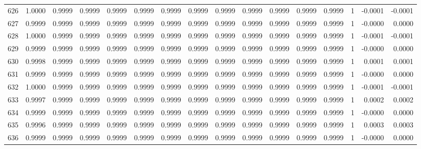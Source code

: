 \begin{tabular}{lrrrrrrrrrrrrrrr}
626 &      1.0000 &  0.9999 &  0.9999 &  0.9999 &  0.9999 &  0.9999 &  0.9999 &  0.9999 &  0.9999 &  0.9999 &   0.9999 &     0.9999 &      1 &                   -0.0001 &                    -0.0001 \\
627 &      0.9999 &  0.9999 &  0.9999 &  0.9999 &  0.9999 &  0.9999 &  0.9999 &  0.9999 &  0.9999 &  0.9999 &   0.9999 &     0.9999 &      1 &                   -0.0000 &                     0.0000 \\
628 &      1.0000 &  0.9999 &  0.9999 &  0.9999 &  0.9999 &  0.9999 &  0.9999 &  0.9999 &  0.9999 &  0.9999 &   0.9999 &     0.9999 &      1 &                   -0.0001 &                    -0.0001 \\
629 &      0.9999 &  0.9999 &  0.9999 &  0.9999 &  0.9999 &  0.9999 &  0.9999 &  0.9999 &  0.9999 &  0.9999 &   0.9999 &     0.9999 &      1 &                   -0.0000 &                     0.0000 \\
630 &      0.9998 &  0.9999 &  0.9999 &  0.9999 &  0.9999 &  0.9999 &  0.9999 &  0.9999 &  0.9999 &  0.9999 &   0.9999 &     0.9999 &      1 &                    0.0001 &                     0.0001 \\
631 &      0.9999 &  0.9999 &  0.9999 &  0.9999 &  0.9999 &  0.9999 &  0.9999 &  0.9999 &  0.9999 &  0.9999 &   0.9999 &     0.9999 &      1 &                   -0.0000 &                     0.0000 \\
632 &      1.0000 &  0.9999 &  0.9999 &  0.9999 &  0.9999 &  0.9999 &  0.9999 &  0.9999 &  0.9999 &  0.9999 &   0.9999 &     0.9999 &      1 &                   -0.0001 &                    -0.0001 \\
633 &      0.9997 &  0.9999 &  0.9999 &  0.9999 &  0.9999 &  0.9999 &  0.9999 &  0.9999 &  0.9999 &  0.9999 &   0.9999 &     0.9999 &      1 &                    0.0002 &                     0.0002 \\
634 &      0.9999 &  0.9999 &  0.9999 &  0.9999 &  0.9999 &  0.9999 &  0.9999 &  0.9999 &  0.9999 &  0.9999 &   0.9999 &     0.9999 &      1 &                   -0.0000 &                     0.0000 \\
635 &      0.9996 &  0.9999 &  0.9999 &  0.9999 &  0.9999 &  0.9999 &  0.9999 &  0.9999 &  0.9999 &  0.9999 &   0.9999 &     0.9999 &      1 &                    0.0003 &                     0.0003 \\
636 &      0.9999 &  0.9999 &  0.9999 &  0.9999 &  0.9999 &  0.9999 &  0.9999 &  0.9999 &  0.9999 &  0.9999 &   0.9999 &     0.9999 &      1 &                   -0.0000 &                     0.0000 \\

\end{tabular}
